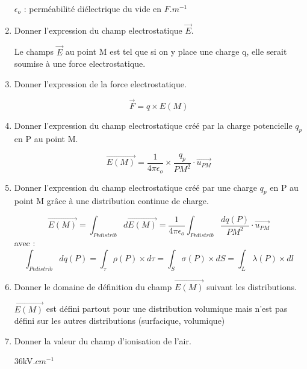 \documentclass{article}
\begin{document}
\begin{enumerate}[label=\arabic{enumi} - , left=0pt, itemsep=1em]
\begin{solution}
           $\epsilon_o$ : perméabilité diélectrique du vide en $F.m^{-1}$
    \end{solution}
    \item Donner l'expression du champ electrostatique $\vec{E}$. \par
    \begin{solution}
          Le champs $\vec{E}$ au point M est tel que si on y place une charge q, elle serait soumise à une force electrostatique.
    \end{solution}
    \item Donner l'expression de la force electrostatique. \par
    \begin{solution}
          \[ \vec{F} = q \times E(M)\]
    \end{solution}
    \item Donner l'expression du champ electrostatique créé par la charge potencielle $q_p$ en P au point M. \par
    \begin{solution}
          \[ \vec{E(M)} = \frac{1}{4 \pi \epsilon_o} \times \frac{q_p}{PM^2} \cdot \vec{u_{PM}} \]
    \end{solution}
    \item Donner l'expression du champ electrostatique créé par une charge $q_p$ en P au point M grâce à une distribution continue de charge. \par
    \begin{solution}
          \[ \vec{E(M)} = \int_{P \epsilon distrib} d\vec{E(M)} = \frac{1}{4 \pi \epsilon_o} \int_{P \epsilon distrib} \frac{dq(P)}{PM^2} \cdot \vec{u_{PM}} \]
          avec : 
          \[ \int_{P \epsilon distrib} dq(P)  = \int_\tau \rho(P) \times d\tau =\int_S \sigma(P) \times dS = \int_L \lambda(P) \times dl \]   
  
    \end{solution}
    \item Donner le domaine de définition du champ $\vec{E(M)}$ suivant les distributions. \par
    \begin{solution}
     $\vec{E(M)}$ est défini partout pour une distribution volumique mais n'est pas défini sur les autres distributions (surfacique, volumique)
  
    \end{solution}
    \item Donner la valeur du champ d'ionisation de l'air. \par
    \begin{solution}
     36kV.$cm^{-1}$
  

\end{solution}
\end{enumerate}
\end{document}
